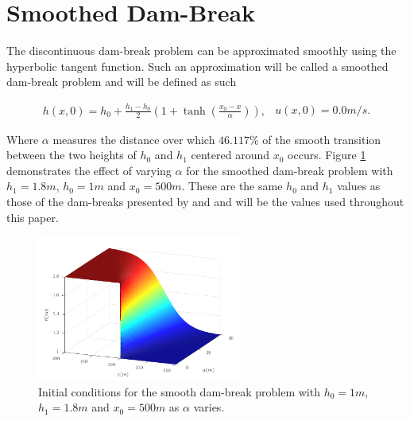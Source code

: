 \documentclass[SingleSpace,12pt,Journal]{Serre_ASCE}
\begin{document}
\section{Smoothed Dam-Break}
\label{section:smootheddambreak}
The discontinuous dam-break problem can be approximated smoothly using the hyperbolic tangent function. Such an approximation will be called a smoothed dam-break problem and will be defined as such
\begin{linenomath*}
\begin{subequations}
\begin{gather}
h(x,0) = h_0 + \frac{h_1 - h_0}{2}\left(1 + \tanh\left(\frac{x_0 - x}{\alpha}\right)\right),
\end{gather}
\begin{gather}
u(x,0) = 0.0m/s.
\end{gather}
\label{eq:sdbi}
\end{subequations}
\end{linenomath*}
Where $\alpha$ measures the distance over which $46.117\%$ of the smooth transition between the two heights of $h_0$ and $h_1$ centered around $x_0$ occurs. Figure \ref{fig:dbsmoothinit} demonstrates the effect of varying $\alpha$ for the smoothed dam-break problem with $h_1 =1.8m$, $h_0 = 1m$ and $x_0 = 500m$. These are the same $h_0$ and $h_1$ values as those of the dam-breaks presented by  and  and will be the values used throughout this paper.
\begin{figure}
\centering
\includegraphics[width=0.6\textwidth]{pics/explainers/dbs.pdf}
\caption{Initial conditions for the smooth dam-break problem with $h_0 = 1m$, $h_1 = 1.8m$ and $x_0 =500m$ as $\alpha$ varies.}
\label{fig:dbsmoothinit}
\end{figure}
%
\end{document}
